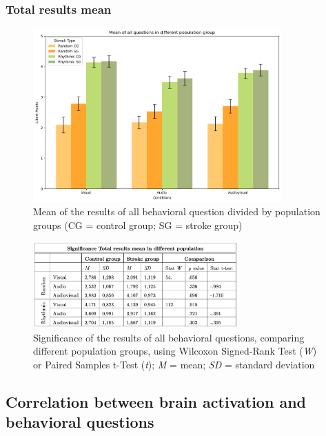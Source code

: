 \subsubsection*{Total results mean}
\begin{figure}[H]
    \centering
    \includegraphics[width=0.85\textwidth]{bar_plots/mean stroke and control.png}
    \caption{Mean of the results of all behavioral question divided by population groups (CG = control group; SG = stroke group)}
    \label{fig: mean_population_condition} 
\end{figure} 
\begin{figure}[H]
    \centering
    \includegraphics[width=0.70\textwidth]{significance_tables/tot_mean_pop.png}
    \caption{Significance of the results of all behavioral questions, comparing different population groups, using Wilcoxon Signed-Rank Test (\textit{W}) or Paired Samples t-Test (\textit{t}); \textit{M} = mean; \textit{SD} = standard deviation}
    \label{fig: significance_total_mean_pop} 
\end{figure} 

\clearpage
\subsection*{Correlation between brain activation and behavioral questions}
